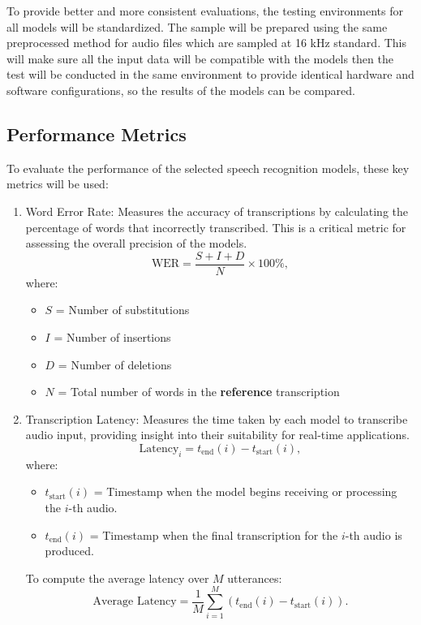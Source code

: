 To provide better and more consistent evaluations, the testing environments for all models will be standardized. The sample will be prepared using the same preprocessed method for audio files which are sampled at 16 kHz standard. This will make sure all the input data will be compatible with the models then the test will be conducted in the same environment to provide identical hardware and software configurations, so the results of the models can be compared. 


\subsection{Performance Metrics}
To evaluate the performance of the selected speech recognition models, these key metrics will be used:

\begin{enumerate}
    \item Word Error Rate: Measures the accuracy of transcriptions by calculating the percentage of words that incorrectly transcribed. This is a critical metric for assessing the overall precision of the models.
    \[
    \text{WER} = \frac{S + I + D}{N} \times 100\%,
    \]
    where:
    \begin{itemize}
        \item \(S\) = Number of substitutions
        \item \(I\) = Number of insertions
        \item \(D\) = Number of deletions
        \item \(N\) = Total number of words in the \textbf{reference} transcription
    \end{itemize}

    \item Transcription Latency: Measures the time taken by each model to transcribe audio input, providing insight into their suitability for real-time applications.
    \[
    \text{Latency}_i = t_{\text{end}}(i) - t_{\text{start}}(i),
    \]
    where:
    \begin{itemize}
        \item \(t_{\text{start}}(i)\) = Timestamp when the model begins receiving or processing the \(i\)-th audio.
        \item \(t_{\text{end}}(i)\) = Timestamp when the final transcription for the \(i\)-th audio is produced.
    \end{itemize}

    To compute the average latency over \(M\) utterances:
    \[
    \text{Average Latency} = \frac{1}{M} \sum_{i=1}^{M} \left( t_{\text{end}}(i) - t_{\text{start}}(i) \right).
    \]


\end{enumerate}
